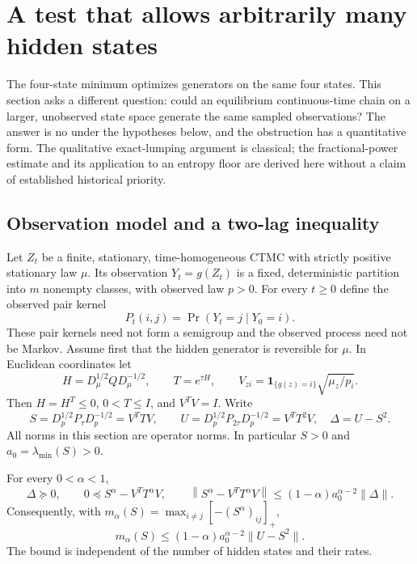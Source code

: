 \section{A test that allows arbitrarily many hidden states}
\label{sec:hidden}

The four-state minimum optimizes generators on the same four states. This
section asks a different question: could an equilibrium continuous-time chain
on a larger, unobserved state space generate the same sampled observations?
The answer is no under the hypotheses below, and the obstruction has a
quantitative form. The qualitative exact-lumping argument is classical;
the fractional-power estimate and its application to an entropy floor are
derived here without a claim of established historical priority.

\subsection{Observation model and a two-lag inequality}

Let $Z_t$ be a finite, stationary, time-homogeneous CTMC with strictly
positive stationary law $\mu$. Its observation $Y_t=g(Z_t)$ is a fixed,
deterministic partition into $m$ nonempty classes, with observed law $p>0$.
For every $t\geq0$ define the observed pair kernel
\[
 P_t(i,j)=\Pr(Y_t=j\mid Y_0=i).
\]
These pair kernels need not form a semigroup and the observed process need
not be Markov. Assume first that the hidden generator is reversible for
$\mu$. In Euclidean coordinates let
\[
 H=D_\mu^{1/2}Q D_\mu^{-1/2},\qquad T=e^{\tau H},\qquad
 V_{zi}=\mathbf1_{\{g(z)=i\}}\sqrt{\mu_z/p_i}.
\]
Then $H=H^T\leq0$, $0<T\leq I$, and $V^TV=I$. Write
\[
 S=D_p^{1/2}P_\tau D_p^{-1/2}=V^TTV,\qquad
 U=D_p^{1/2}P_{2\tau}D_p^{-1/2}=V^TT^2V,
 \quad \Delta=U-S^2.
\]
All norms in this section are operator norms. In particular $S>0$ and
$a_0=\lambda_{\min}(S)>0$.

\begin{theorem}
\label{thm:hidden-test}
For every $0<\alpha<1$,
\[
 \Delta\succeq0,\qquad
 0\preceq S^\alpha-V^TT^\alpha V,
 \qquad
 \left\|S^\alpha-V^TT^\alpha V\right\|
 \leq(1-\alpha)a_0^{\alpha-2}\|\Delta\|.
\]
Consequently, with $m_\alpha(S)=\max_{i\ne j}[-(S^\alpha)_{ij}]_+$,
\[
 \boxed{\quad
 m_\alpha(S)\leq(1-\alpha)a_0^{\alpha-2}\|U-S^2\|.
 \quad}
\tag{H1}
\]
The bound is independent of the number of hidden states and their rates.
\end{theorem}

